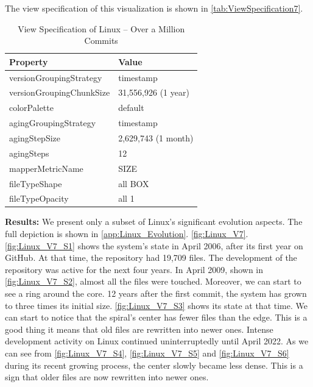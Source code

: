 The view specification of this visualization is shown in \autoref{tab:ViewSpecification7}.
\begin{table}[h]
	\small
    \centering
    \begin{tabular}{@{}ll@{}} 
        \toprule
        \textbf{Property} & \textbf{Value} \\\midrule
        versionGroupingStrategy & timestamp\\ 
		versionGroupingChunkSize & 31,556,926 (1 year)\\
		colorPalette & default\\
		agingGroupingStrategy & timestamp \\
		agingStepSize & 2,629,743 (1 month) \\
		agingSteps & 12 \\
		mapperMetricName & SIZE \\
		fileTypeShape & all BOX \\
		fileTypeOpacity & all 1 \\\bottomrule
    \end{tabular}
            \caption{View Specification of Linux – Over a Million Commits}
    \label{tab:ViewSpecification7}
\end{table}

\noindent
\textbf{Results:}
We present only a subset of Linux's significant evolution aspects. The full depiction is shown in \autoref{app:Linux_Evolution}. \autoref{fig:Linux_V7}. \autoref{fig:Linux_V7_S1} shows the system's state in April 2006, after its first year on GitHub. At that time, the repository had 19,709 files. The development of the repository was active for the next four years. In April 2009, shown in \autoref{fig:Linux_V7_S2}, almost all the files were touched. Moreover, we can start to see a ring around the core. 
12 years after the first commit, the system has grown to three times its initial size. \autoref{fig:Linux_V7_S3} shows its state at that time. We can start to notice that the spiral's center has fewer files than the edge. This is a good thing it means that old files are rewritten into newer ones. Intense development activity on Linux continued uninterruptedly until April 2022. As we can see from \autoref{fig:Linux_V7_S4}, \autoref{fig:Linux_V7_S5} and \autoref{fig:Linux_V7_S6} during its recent growing process, the center slowly became less dense. This is a sign that older files are now rewritten into newer ones. 

